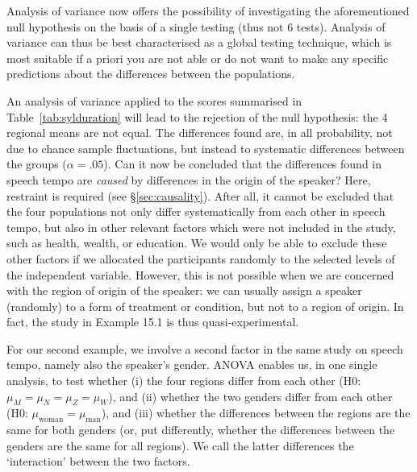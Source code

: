 \documentclass[
]{book}
\begin{document}
Analysis of variance now offers the possibility of investigating the
aforementioned null hypothesis on the basis of
a single testing (thus not 6 tests). Analysis of variance can thus be best
characterised as a global testing technique, which is most suitable
if a priori you are not able or do not want to make any specific predictions
about the differences between the populations.

An analysis of variance applied to the scores summarised in
Table~\ref{tab:sylduration}
will lead to the rejection of the null hypothesis: the 4 regional
means are not equal. The differences found are, in all probability, not due to
chance sample fluctuations, but instead to systematic differences between
the groups (\(\alpha=.05\)). Can it now be concluded that the differences
found in speech tempo are \emph{caused} by differences in the origin of the
speaker? Here, restraint is required (see
§\ref{sec:causality}). After all, it cannot be excluded that
the four populations not only differ systematically from each other in speech
tempo, but also in other relevant factors which were not included in the study,
such as health, wealth, or education. We would only be able to exclude these other
factors if we allocated the participants randomly to the selected levels of the
independent variable. However, this is not possible when we are concerned with the
region of origin of the speaker: we can usually assign a speaker (randomly)
to a form of treatment or condition, but not to a region of origin. In fact,
the study in Example 15.1 is thus quasi-experimental.

For our second example, we involve a second factor in the same study
on speech tempo, namely also the speaker's gender.
ANOVA enables us, in one single analysis, to test whether (i) the four
regions differ from each other (H0: \(\mu_M = \mu_N = \mu_Z = \mu_W\)), and
(ii) whether the two genders differ from each other (H0:
\(\mu_\textrm{woman} = \mu_\textrm{man}\)), and (iii) whether the differences
between the regions are the same for both genders (or, put differently, whether
the differences between the genders are the same for all
regions). We call the latter differences the `interaction' between the two factors.
\end{document}
